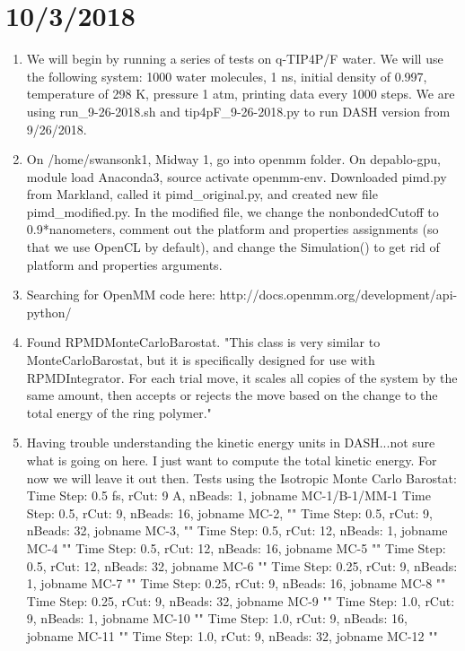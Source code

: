 \documentclass[12pt,reqno]{amsart}
\numberwithin{equation}{section}
\begin{document}
\section{10/3/2018}
\begin{enumerate}
\item We will begin by running a series of tests on q-TIP4P/F water.  We will use the following system: 1000 water molecules, 1 ns, initial density of 0.997, temperature of 298 K, pressure 1 atm, printing data every 1000 steps.  We are using run\_9-26-2018.sh and tip4pF\_9-26-2018.py to run DASH version from 9/26/2018.  
\item On /home/swansonk1, Midway 1, go into openmm folder.  On depablo-gpu, module load Anaconda3, source activate openmm-env.  Downloaded pimd.py from Markland, called it pimd\_original.py, and created new file pimd\_modified.py.  In the modified file, we change the nonbondedCutoff to 0.9*nanometers, comment out the platform and properties assignments (so that we use OpenCL by default), and change the Simulation() to get rid of platform and properties arguments.  
\item Searching for OpenMM code here: http://docs.openmm.org/development/api-python/
\item Found RPMDMonteCarloBarostat.  "This class is very similar to MonteCarloBarostat, but it is specifically designed for use with RPMDIntegrator.  For each trial move, it scales all copies of the system by the same amount, then accepts or rejects the move based on the change to the total energy of the ring polymer."
\item Having trouble understanding the kinetic energy units in DASH...not sure what is going on here.  I just want to compute the total kinetic energy.  For now we will leave it out then.  
\subitem Tests using the Isotropic Monte Carlo Barostat:
\subsubitem Time Step: 0.5 fs, rCut: 9 A, nBeads: 1, jobname MC-1/B-1/MM-1
\subsubitem Time Step: 0.5, rCut: 9, nBeads: 16, jobname MC-2, ""
\subsubitem Time Step: 0.5, rCut: 9, nBeads: 32, jobname MC-3, ""
\subsubitem Time Step: 0.5, rCut: 12, nBeads: 1, jobname MC-4 ""
\subsubitem Time Step: 0.5, rCut: 12, nBeads: 16, jobname MC-5 ""
\subsubitem Time Step: 0.5, rCut: 12, nBeads: 32, jobname MC-6 ""
\subsubitem Time Step: 0.25, rCut: 9, nBeads: 1, jobname MC-7 ""
\subsubitem Time Step: 0.25, rCut: 9, nBeads: 16, jobname MC-8 ""
\subsubitem Time Step: 0.25, rCut: 9, nBeads: 32, jobname MC-9 ""
\subsubitem Time Step: 1.0, rCut: 9, nBeads: 1, jobname MC-10 ""
\subsubitem Time Step: 1.0, rCut: 9, nBeads: 16, jobname MC-11 ""
\subsubitem Time Step: 1.0, rCut: 9, nBeads: 32, jobname MC-12 ""
\end{enumerate}





\normalsize

\end{document}

